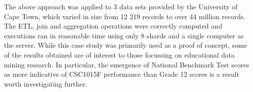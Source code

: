 The above approach was applied to 3 data sets provided by the University of Cape Town, which varied in size from 12 219 records to over 44 million records. The ETL, join and aggregation operations were correctly computed and executions ran in reasonable time using only 8 shards and a single computer as the server. While this case study was primarily used as a proof of concept, some of the results obtained are of interest to those focussing on educational data mining research. In particular, the emergence of National Benchmark Test scores as more indicative of CSC1015F performance than Grade 12 scores is a result worth investigating further.